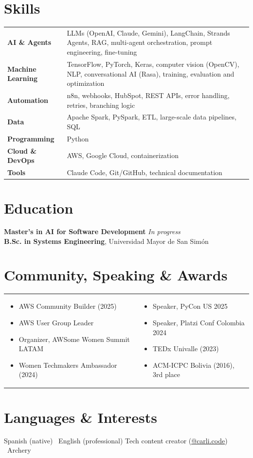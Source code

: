 \documentclass[10pt,letterpaper]{article}
\begin{document}
\section*{Skills}
\renewcommand{\arraystretch}{1.15}
\begin{tabularx}{\textwidth}{@{}>{\bfseries}p{3.7cm}X@{}}
AI \& Agents        & LLMs (OpenAI, Claude, Gemini), LangChain, Strands Agents, RAG, multi-agent orchestration, prompt engineering, fine-tuning \\
Machine Learning    & TensorFlow, PyTorch, Keras, computer vision (OpenCV), NLP, conversational AI (Rasa), training, evaluation and optimization \\
Automation          & n8n, webhooks, HubSpot, REST APIs, error handling, retries, branching logic \\
Data                & Apache Spark, PySpark, ETL, large-scale data pipelines, SQL \\
Programming         & Python \\
Cloud \& DevOps     & AWS, Google Cloud, containerization \\
Tools               & Claude Code, Git/GitHub, technical documentation \\
\end{tabularx}

\section*{Education}
\textbf{Master's in AI for Software Development} \hfill {\small\itshape In progress}\\
\textbf{B.Sc. in Systems Engineering}, Universidad Mayor de San Simón

\section*{Community, Speaking \& Awards}
\begin{tabularx}{\textwidth}{@{}XX@{}}
\begin{itemize}
  \item AWS Community Builder (2025)
  \item AWS User Group Leader
  \item Organizer, AWSome Women Summit LATAM
  \item Women Techmakers Ambassador (2024)
\end{itemize}
&
\begin{itemize}
  \item Speaker, PyCon US 2025
  \item Speaker, Platzi Conf Colombia 2024
  \item TEDx Univalle (2023)
  \item ACM-ICPC Bolivia (2016), 3rd place
\end{itemize}
\end{tabularx}

\section*{Languages \& Interests}
Spanish (native) \textbullet\ English (professional) \quad \textbar \quad
Tech content creator (\href{https://www.instagram.com/carli.code/}{\underline{@carli.code}}) \textbullet\ Archery
\end{document}
